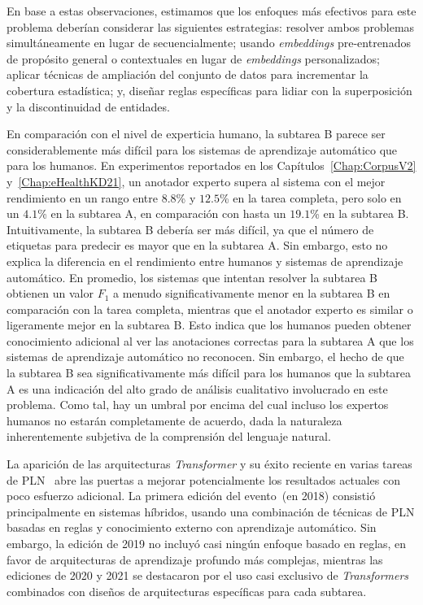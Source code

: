 En base a estas observaciones, estimamos que los enfoques más efectivos para este problema deberían considerar las siguientes estrategias:
resolver ambos problemas simultáneamente en lugar de secuencialmente; usando \textit{embeddings} pre-entrenados de propósito general o contextuales en lugar de \textit{embeddings} personalizados; aplicar técnicas de ampliación del conjunto de datos para incrementar la cobertura estadística; y, diseñar reglas específicas para lidiar con la superposición y la discontinuidad de entidades.

En comparación con el nivel de experticia humano, la subtarea B parece ser considerablemente más difícil para los sistemas de aprendizaje automático que para los humanos.
En experimentos reportados en los Capítulos~\ref{Chap:CorpusV2} y~\ref{Chap:eHealthKD21}, un anotador experto supera al sistema con el mejor rendimiento en un rango entre $8.8$\% y $12.5$\% en la tarea completa, pero solo en un $4.1$\% en la subtarea A, en comparación con hasta un $19.1$\% en la subtarea B.
Intuitivamente, la subtarea B debería ser más difícil, ya que el número de etiquetas para predecir es mayor que en la subtarea A.
Sin embargo, esto no explica la diferencia en el rendimiento entre humanos
y sistemas de aprendizaje automático.
En promedio, los sistemas que intentan resolver la subtarea B obtienen un valor $F_1$ a menudo significativamente menor en la subtarea B en comparación con la tarea completa, mientras que el anotador experto es similar o ligeramente mejor en la subtarea B.
Esto indica que los humanos pueden obtener conocimiento adicional al ver las anotaciones correctas para la subtarea A que los sistemas de aprendizaje automático no reconocen.
Sin embargo, el hecho de que la subtarea B sea significativamente más difícil para los humanos que la subtarea A es una indicación del alto grado de análisis cualitativo involucrado en este problema.
Como tal, hay un umbral por encima del cual incluso los expertos humanos no estarán completamente de acuerdo, dada la naturaleza inherentemente subjetiva de la comprensión del lenguaje natural.

La aparición de las arquitecturas \textit{Transformer} y su éxito reciente en varias tareas de PLN~\cite{bert} abre las puertas a mejorar potencialmente los resultados actuales con poco esfuerzo adicional. La primera edición del evento~(en 2018) consistió principalmente en sistemas híbridos, usando una combinación de técnicas de PLN basadas en reglas y conocimiento externo con aprendizaje automático. Sin embargo, la edición de 2019 no incluyó casi ningún enfoque basado en reglas, en favor de arquitecturas de aprendizaje profundo más complejas, mientras las ediciones de 2020 y 2021 se destacaron por el uso casi exclusivo de \textit{Transformers} combinados con diseños de arquitecturas específicas para cada subtarea.

